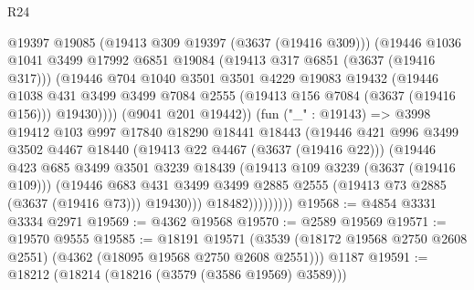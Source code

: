 \begin{lexlean}{R24}
\begin{coremodule}
                        @19397
                        @19085
                        (@19413 @309 @19397 (@3637 (@19416 @309)))
                        (@19446
                          @1036
                          @1041
                          @3499
                          @17992
                          @6851
                          @19084
                          (@19413 @317 @6851 (@3637 (@19416 @317)))
                          (@19446
                            @704
                            @1040
                            @3501
                            @3501
                            @4229
                            @19083
                            @19432
                            (@19446
                              @1038
                              @431
                              @3499
                              @3499
                              @7084
                              @2555
                              (@19413 @156 @7084 (@3637 (@19416 @156)))
                              @19430))))
                      (@9041 @201 @19442))
                    (fun ("_" : @19143) =>
                    @3998
                      @19412
                      @103
                      @997
                      @17840
                      @18290
                      @18441
                      @18443
                      (@19446
                        @421
                        @996
                        @3499
                        @3502
                        @4467
                        @18440
                        (@19413 @22 @4467 (@3637 (@19416 @22)))
                        (@19446
                          @423
                          @685
                          @3499
                          @3501
                          @3239
                          @18439
                          (@19413 @109 @3239 (@3637 (@19416 @109)))
                          (@19446
                            @683
                            @431
                            @3499
                            @3499
                            @2885
                            @2555
                            (@19413 @73 @2885 (@3637 (@19416 @73)))
                            @19430)))
                      @18482)))))))))
@19568 := @4854 @3331 @3334 @2971
@19569 := @4362 @19568
@19570 := @2589 @19569
@19571 := @19570 @9555
@19585 := @18191
    @19571
    (@3539 (@18172 @19568 @2750 @2608 @2551) (@4362 (@18095 @19568 @2750 @2608 @2551)))
    @1187
@19591 := @18212 (@18214 (@18216 (@3579 (@3586 @19569) @3589)))

\end{coremodule}
\end{lexlean}
